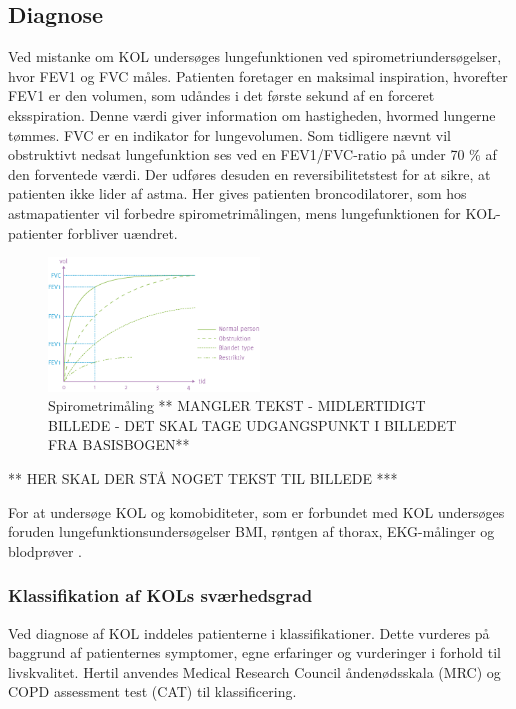 \subsection{Diagnose}
Ved mistanke om KOL undersøges lungefunktionen ved spirometriundersøgelser, hvor FEV1 og FVC måles. Patienten foretager en maksimal inspiration, hvorefter FEV1 er den volumen, som udåndes i det første sekund af en forceret eksspiration. Denne værdi giver information om hastigheden, hvormed lungerne tømmes. FVC er en indikator for lungevolumen. Som tidligere nævnt vil obstruktivt nedsat lungefunktion ses ved en FEV1/FVC-ratio på under 70 \% af den forventede værdi. Der udføres desuden en reversibilitetstest for at sikre, at patienten ikke lider af astma. Her gives patienten broncodilatorer, som hos astmapatienter vil forbedre spirometrimålingen, mens lungefunktionen for KOL-patienter forbliver uændret.\cite{Basisbogen2016, Sundhed2013} 

\begin{figure} [H]
\centering
\includegraphics[width=0.5\textwidth]{figures/FEV}
\caption{Spirometrimåling ** MANGLER TEKST - MIDLERTIDIGT BILLEDE - DET SKAL TAGE UDGANGSPUNKT I BILLEDET FRA BASISBOGEN**}
\label{fig:FEV}
\end{figure} 

\noindent
** HER SKAL DER STÅ NOGET TEKST TIL BILLEDE ***

For at undersøge KOL og komobiditeter, som er forbundet med KOL undersøges foruden lungefunktionsundersøgelser BMI, røntgen af thorax, EKG-målinger og blodprøver \cite{Sundhed2013}. 

\subsubsection{Klassifikation af KOLs sværhedsgrad}
Ved diagnose af KOL inddeles patienterne i klassifikationer. Dette vurderes på baggrund af patienternes symptomer, egne erfaringer og vurderinger i forhold til livskvalitet. Hertil anvendes Medical Research Council åndenødsskala (MRC) og COPD assessment test (CAT) til klassificering.\cite{Basisbogen2016}
 
